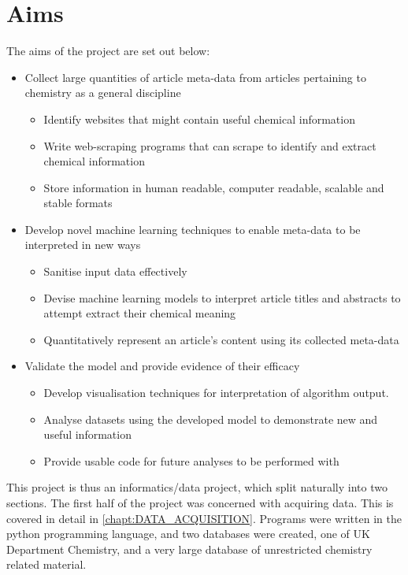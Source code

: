 \section{Aims}
The aims of the project are set out below:
\begin{itemize}
\item Collect large quantities of article meta-data from articles pertaining to chemistry as a general discipline
\begin{itemize}
\item Identify websites that might contain useful chemical information
\item Write web-scraping programs that can scrape to identify and extract chemical information
\item Store information in human readable, computer readable, scalable and stable formats
\end{itemize}
\item Develop novel machine learning techniques to enable meta-data to be interpreted in new ways
\begin{itemize}
\itemsep0em 
\item Sanitise input data effectively
\item Devise  machine learning models to interpret article titles and abstracts to attempt extract their chemical meaning
\item Quantitatively represent an article's content using its collected meta-data
\end{itemize}
\item Validate the model and provide evidence of their efficacy
\begin{itemize}
\item Develop visualisation techniques for interpretation of algorithm output.
\item Analyse datasets using the developed model to demonstrate new and useful information
\item Provide usable code for future analyses to be performed with
\end{itemize}
\end{itemize}
This project is thus an informatics/data project, which split naturally into two sections. The first half of the project was concerned with acquiring data. This is covered in detail in \ref{chapt:DATA_ACQUISITION}.
Programs were written in the python programming language, and two databases were created, one of UK Department Chemistry, and a very large database of unrestricted chemistry related material.

